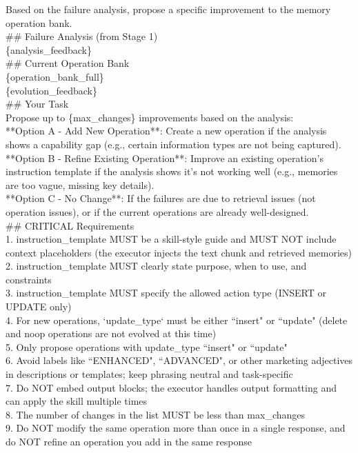 \begin{center}
\begin{tcolorbox}[title={Designer Refinement Prompt (1/2)}]
{
Based on the failure analysis, propose a specific improvement to the memory operation bank. \\

\#\# Failure Analysis (from Stage 1) \\
\{analysis\_feedback\} \\

\#\# Current Operation Bank \\
\{operation\_bank\_full\} \\

\{evolution\_feedback\} \\

\#\# Your Task \\
Propose up to \{max\_changes\} improvements based on the analysis: \\

**Option A - Add New Operation**: Create a new operation if the analysis shows a capability gap (e.g., certain information types are not being captured). \\
**Option B - Refine Existing Operation**: Improve an existing operation's instruction template if the analysis shows it's not working well (e.g., memories are too vague, missing key details). \\
**Option C - No Change**: If the failures are due to retrieval issues (not operation issues), or if the current operations are already well-designed. \\

\#\# CRITICAL Requirements \\
1. instruction\_template MUST be a skill-style guide and MUST NOT include context placeholders (the executor injects the text chunk and retrieved memories) \\
2. instruction\_template MUST clearly state purpose, when to use, and constraints \\
3. instruction\_template MUST specify the allowed action type (INSERT or UPDATE only) \\
4. For new operations, `update\_type` must be either ``insert" or ``update" (delete and noop operations are not evolved at this time) \\
5. Only propose operations with update\_type ``insert" or ``update" \\
6. Avoid labels like ``ENHANCED", ``ADVANCED", or other marketing adjectives in descriptions or templates; keep phrasing neutral and task-specific \\
7. Do NOT embed output blocks; the executor handles output formatting and can apply the skill multiple times \\
8. The number of changes in the list MUST be less than {max\_changes} \\
9. Do NOT modify the same operation more than once in a single response, and do NOT refine an operation you add in the same response \\

}
\end{tcolorbox}
\end{center}
